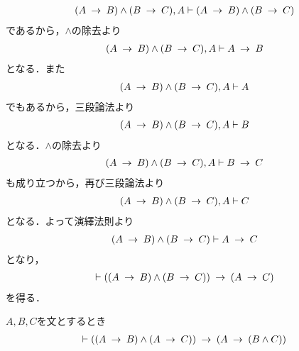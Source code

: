 	\begin{prf}
		\begin{align}
			(A \rarrow B) \wedge (B \rarrow C),A \vdash 
			(A \rarrow B) \wedge (B \rarrow C)
		\end{align}
		であるから，$\wedge$の除去より
		\begin{align}
			(A \rarrow B) \wedge (B \rarrow C),A \vdash A \rarrow B
		\end{align}
		となる．また
		\begin{align}
			(A \rarrow B) \wedge (B \rarrow C),A \vdash A
		\end{align}
		でもあるから，三段論法より
		\begin{align}
			(A \rarrow B) \wedge (B \rarrow C),A \vdash B
		\end{align}
		となる．$\wedge$の除去より
		\begin{align}
			(A \rarrow B) \wedge (B \rarrow C),A \vdash B \rarrow C
		\end{align}
		も成り立つから，再び三段論法より
		\begin{align}
			(A \rarrow B) \wedge (B \rarrow C),A \vdash C
		\end{align}
		となる．よって演繹法則より
		\begin{align}
			(A \rarrow B) \wedge (B \rarrow C) \vdash A \rarrow C
		\end{align}
		となり，
		\begin{align}
			\vdash ((A \rarrow B) \wedge (B \rarrow C)) 
			\rarrow (A \rarrow C)
		\end{align}
		を得る．
		\QED
	\end{prf}
	
	\begin{screen}
		\begin{logicalthm}[二式が同時に導かれるならその論理積が導かれる]
		\label{logicalthm:conjunction_of_consequences}
			$A,B,C$を文とするとき
			\begin{align}
				\vdash ((A \rarrow B) \wedge (A \rarrow C))
				\rarrow (A \rarrow (B \wedge C))
			\end{align}
		\end{logicalthm}
	\end{screen}
	
